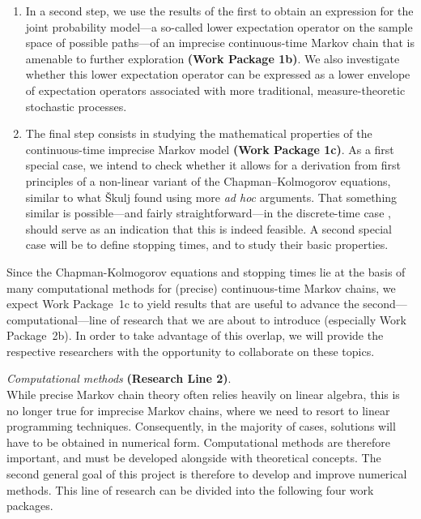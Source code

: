 \documentclass[11pt,dvipsnames,usenames,a4paper]{article}
\begin{document}
\begin{enumerate}[label=\tiny$\blacksquare$,leftmargin=*,noitemsep]
\item In a second step, we use the results of the first to obtain an expression for the joint probability model---a so-called lower expectation operator on the sample space of possible paths---of an imprecise continuous-time Markov chain that is amenable to further exploration {\bf(Work Package 1b)}.
We also investigate whether this lower expectation operator can be expressed as a lower envelope of expectation operators associated with more traditional, measure-theoretic stochastic processes.
\item The final step consists in studying the mathematical properties of the continuous-time imprecise Markov model {\bf(Work Package 1c)}.
As a first special case, we intend to check whether it allows for a derivation from first principles of a non-linear variant of the Chapman--Kolmogorov equations, similar to what \v{S}kulj \cite{skulj2015:continuous:bounds} found using more {\itshape ad hoc} arguments.
That something similar is possible---and fairly straightforward---in the discrete-time case \cite{cooman2008}, should serve as an indication that this is indeed feasible. 
A second special case will be to define stopping times, and to study their basic properties.
\end{enumerate}
Since the Chapman-Kolmogorov equations and stopping times lie at the basis of many computational methods for (precise) continuous-time Markov chains, we expect Work Package~1c to yield results that are useful to advance the second---computational---line of research that we are about to introduce (especially Work Package~2b). In order to take advantage of this overlap, we will provide the respective researchers with the opportunity to collaborate on these topics.

\emph{Computational methods} {\bf (Research Line 2)}.\\[3pt]
While precise Markov chain theory often relies heavily on linear algebra, this is no longer true for imprecise Markov chains, where we need to resort to linear programming techniques. 
Consequently, in the majority of cases, solutions will have to be obtained in numerical form.
Computational methods are therefore important, and must be developed alongside with theoretical concepts. 
The second general goal of this project is therefore to develop and improve numerical methods. This line of research can be divided into the following four work packages.
\end{document}
